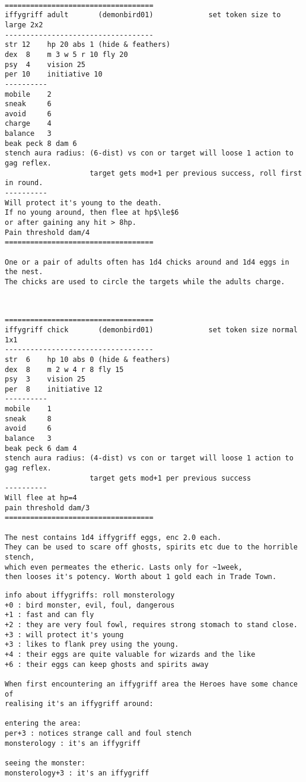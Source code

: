 \

\goodbreak \begin{samepage} \small \begin{verbatim}
===================================
iffygriff adult       (demonbird01)             set token size to large 2x2
-----------------------------------
str 12    hp 20 abs 1 (hide & feathers)
dex  8    m 3 w 5 r 10 fly 20
psy  4    vision 25
per 10    initiative 10
----------
mobile    2
sneak     6
avoid     6
charge    4
balance   3
beak peck 8 dam 6
stench aura radius: (6-dist) vs con or target will loose 1 action to gag reflex.
                    target gets mod+1 per previous success, roll first in round.
----------
Will protect it's young to the death.
If no young around, then flee at hp$\le$6
or after gaining any hit > 8hp.
Pain threshold dam/4
===================================

One or a pair of adults often has 1d4 chicks around and 1d4 eggs in the nest.
The chicks are used to circle the targets while the adults charge.
\end{verbatim} \normalsize \end{samepage}

\

\goodbreak \begin{samepage} \small \begin{verbatim}
===================================
iffygriff chick       (demonbird01)             set token size normal 1x1
-----------------------------------
str  6    hp 10 abs 0 (hide & feathers)
dex  8    m 2 w 4 r 8 fly 15
psy  3    vision 25
per  8    initiative 12
----------
mobile    1
sneak     8
avoid     6
balance   3
beak peck 6 dam 4
stench aura radius: (4-dist) vs con or target will loose 1 action to gag reflex.
                    target gets mod+1 per previous success
----------
Will flee at hp=4
pain threshold dam/3
===================================

The nest contains 1d4 iffygriff eggs, enc 2.0 each.
They can be used to scare off ghosts, spirits etc due to the horrible stench,
which even permeates the etheric. Lasts only for ~1week,
then looses it's potency. Worth about 1 gold each in Trade Town.
\end{verbatim} \end{samepage} \goodbreak \begin{samepage} \begin{verbatim}
info about iffygriffs: roll monsterology
+0 : bird monster, evil, foul, dangerous
+1 : fast and can fly
+2 : they are very foul fowl, requires strong stomach to stand close.
+3 : will protect it's young
+3 : likes to flank prey using the young.
+4 : their eggs are quite valuable for wizards and the like
+6 : their eggs can keep ghosts and spirits away

When first encountering an iffygriff area the Heroes have some chance of
realising it's an iffygriff around:

entering the area:
per+3 : notices strange call and foul stench
monsterology : it's an iffygriff

seeing the monster:
monsterology+3 : it's an iffygriff
\end{verbatim} \normalsize \end{samepage}

